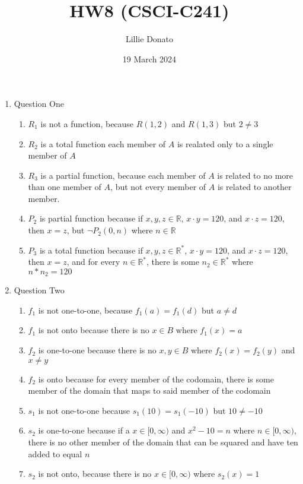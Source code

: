 \documentclass{article}
\title{HW8 (CSCI-C241)}
\author{Lillie Donato}
\date{19 March 2024}
\begin{document}
\maketitle

\begin{enumerate}
    \item Question One
    \begin{enumerate}
        \item $R_1$ is not a function, because $R(1, 2)$ and $R(1, 3)$ but $2 \neq 3$
        \item $R_2$ is a total function each member of $A$ is realated only to a single member of $A$
        \item $R_3$ is a partial function, because each member of $A$ is related to no more than one member of $A$, but not every member of $A$ is related to another member.
        \item $P_2$ is partial function because if $x,y,z \in \mathbb{R}$, $x \cdot y=120$, and $x \cdot z = 120$, then $x = z$, but $\neg P_2(0, n)$ where $n \in \mathbb{R}$
        \item $P_3$ is a total function because if $x,y,z \in \mathbb{R}^*$, $x \cdot y=120$, and $x \cdot z = 120$, then $x = z$, and for every $n \in \mathbb{R}^*$, there is some $n_2 \in \mathbb{R}^*$ where $n*n_2 = 120$
    \end{enumerate}
    \item Question Two
    \begin{enumerate}
        \item $f_1$ is not one-to-one, because $f_1(a) = f_1(d)$ but $a \neq d$
        \item $f_1$ is not onto because there is no $x \in B$ where $f_1(x) = a$
        \item $f_2$ is one-to-one because there is no $x,y \in B$ where $f_2(x) = f_2(y)$ and $x \neq y$
        \item $f_2$ is onto because for every member of the codomain, there is some member of the domain that maps to said member of the codomain 
        \item $s_1$ is not one-to-one because $s_1(10) = s_1(-10)$ but $10 \neq -10$
        \item $s_2$ is one-to-one because if a $x \in [0,\infty)$ and $x^2 - 10 = n$ where $n \in [0, \infty)$, there is no other member of the domain that can be squared and have ten added to equal $n$
        \item $s_2$ is not onto, because there is no $x \in [0,\infty)$ where $s_2(x) = 1$

\end{enumerate}
\end{enumerate}
\end{document}
